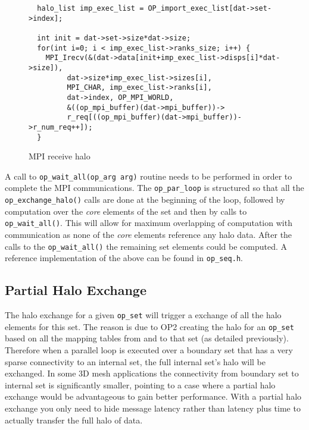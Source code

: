 \documentclass[11pt]{article}
\begin{document}
\begin{figure}[t]\small
\begin{verbatim}
  halo_list imp_exec_list = OP_import_exec_list[dat->set->index];

  int init = dat->set->size*dat->size;
  for(int i=0; i < imp_exec_list->ranks_size; i++) {
    MPI_Irecv(&(dat->data[init+imp_exec_list->disps[i]*dat->size]),
         dat->size*imp_exec_list->sizes[i],
         MPI_CHAR, imp_exec_list->ranks[i],
         dat->index, OP_MPI_WORLD,
         &((op_mpi_buffer)(dat->mpi_buffer))->
         r_req[((op_mpi_buffer)(dat->mpi_buffer))->r_num_req++]);
  }
\end{verbatim}
\caption{\small MPI receive halo}
\normalsize\vspace{-0pt}\label{fig:recivehalo}
\end{figure}

\noindent A call to \texttt{op\_wait\_all(op\_arg arg)} routine needs to be performed in order to complete the MPI
communications. The \texttt{op\_par\_loop} is structured so that all the \texttt{op\_exchange\_halo()} calls are done at
the beginning of the loop, followed by computation over the \textit{core} elements of the set and then by calls to
\texttt{op\_wait\_all()}. This will allow for maximum overlapping of computation with communication as none of the
\textit{core} elements reference any halo data. After the calls to the \texttt{op\_wait\_all()} the remaining set
elements could be computed. A reference implementation of the above can be found in \texttt{op\_seq.h}.

\subsection{Partial Halo Exchange}\label{sec/partialhalo}

The halo exchange for a given \texttt{op\_set} will trigger a exchange of all the halo elements for this set. The reason
is due to OP2 creating the halo for an \texttt{op\_set} based on all the mapping tables from and to that set (as
detailed previously). Therefore when a parallel loop is executed over a boundary set that has a very sparse connectivity
to an internal set, the full internal set's halo will be exchanged. In some 3D mesh applications the connectivity from
boundary set to internal set is significantly smaller, pointing to a case where a partial halo exchange would be
advantageous to gain better performance. With a partial halo exchange you only need to hide message latency rather than
latency plus time to actually transfer the full halo of data.
\end{document}
